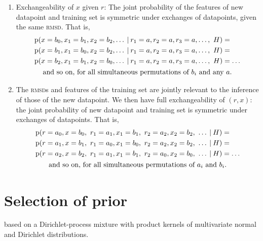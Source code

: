 \documentclass[\ifafour a4paper,12pt,\else a5paper,10pt,\fi%
onecolumn,oneside,article,%
british%
]{memoir}
\theoremstyle{remark}
\theoremstyle{innote}
\newcommand*{\p}{\mathrm{p}}%
\renewcommand*{\|}[1][]{\nonscript\:#1\vert\nonscript\:\mathopen{}}
\renewcommand*{\=}{\TextOrMath\texteq\eq}
\newcommand*{\rmsd}{\textsc{rmsd}}
\begin{document}
\begin{enumerate}[label=\roman*.]
\item\label{item:exch_xr} Exchangeability of $x$ given $r$: The joint
  probability of the features of new datapoint and training set is symmetric
  under exchanges of datapoints, given the same \rmsd. That is,
  \begin{multline}
    \label{eq:p_exch_xr}
    \begin{aligned}
    &\p(x=b_{0}, x_{1}=b_{1}, x_{2}=b_{2}, \dotsc \|
    r_{1}=a, r_{2}=a, r_{3}=a, \dotsc,\ H) ={}\\
    &\p(x=b_{1}, x_{1}=b_{0}, x_{2}=b_{2}, \dotsc \|
    r_{1}=a, r_{2}=a, r_{3}=a, \dotsc,\ H) ={}\\
    &\p(x=b_{2}, x_{1}=b_{1}, x_{2}=b_{0}, \dotsc \|
    r_{1}=a, r_{2}=a, r_{3}=a, \dotsc,\ H) = \dotso
    \end{aligned} \\
    \text{and so on, for all simultaneous permutations of $b_{i}$ and any $a$.}
  \end{multline}
\item\label{item:exch_full} The \rmsd s and features of the training set
  are jointly relevant to the inference of those of the new datapoint. We
  then have full exchangeability of $(r,x)$: the joint probability of new
  datapoint and training set is symmetric under exchanges of datapoints.
  That is,
  \begin{multline}
    \label{eq:p_exch_full}
    \begin{aligned}
    &\p(r=a_{0}, x=b_{0},\ r_{1}=a_{1},x_{1}=b_{1}, \
    r_{2}=a_{2},x_{2}=b_{2}, \ \dotsc \| H) ={}\\
    &\p(r=a_{1}, x=b_{1},\ r_{1}=a_{0},x_{1}=b_{0}, \
    r_{2}=a_{2},x_{2}=b_{2}, \ \dotsc \| H) ={}\\
    &\p(r=a_{2}, x=b_{2},\ r_{1}=a_{1},x_{1}=b_{1}, \
      r_{2}=a_{0},x_{2}=b_{0}, \ \dotsc \| H) = \dotso
    \end{aligned} \\
    \text{and so on, for all simultaneous permutations of $a_{i}$ and $b_{i}$.}
  \end{multline}

\end{enumerate}



\section{Selection of prior}
\label{sec:sel_prior}

based on a Dirichlet-process mixture with
product kernels of multivariate normal and Dirichlet distributions.
\end{document}
